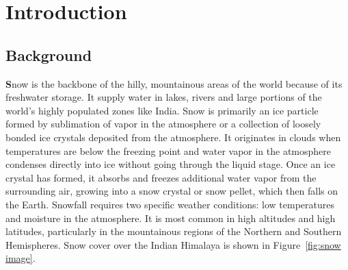 \chapter{Introduction}
\section{Background}

\label{sec:background}

\lettrine[findent=2pt]{\textbf{S}}{}now is the backbone of the hilly, mountainous areas of the world because of its freshwater storage. It supply water in lakes, rivers and large portions of the world's highly populated zones like India. Snow is primarily an ice particle formed by sublimation of vapor in the atmosphere or a collection of loosely bonded ice crystals deposited from the atmosphere. It originates in clouds when temperatures are below the freezing point and water vapor in the atmosphere condenses directly into ice without going through the liquid stage. Once an ice crystal has formed, it absorbs and freezes additional water vapor from the surrounding air, growing into a snow crystal or snow pellet, which then falls on the Earth. Snowfall requires two specific weather conditions: low temperatures and moisture in the atmosphere. It is most common in high altitudes and high latitudes, particularly in the mountainous regions of the Northern and Southern Hemispheres. Snow cover over the Indian Himalaya is shown in Figure~\ref{fig:snow image}.
